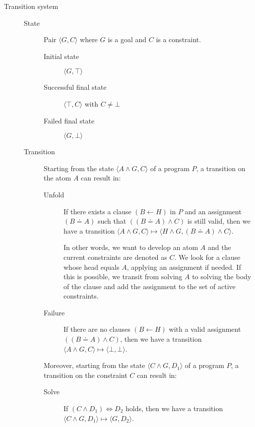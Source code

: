 \begin{description}
    \item[Transition system] 
        \phantom{}
        \begin{description}
            \item[State] Pair $\langle G, C \rangle$ where $G$ is a goal and $C$ is a constraint.
                \begin{description}
                    \item[Initial state] $\langle G, \top \rangle$ 
                    \item[Successful final state] $\langle \top, C \rangle$ with $C \neq \bot$
                    \item[Failed final state] $\langle G, \bot \rangle$
                \end{description}

            \item[Transition]
                Starting from the state $\langle A \land G, C \rangle$ of a program $P$, a transition on the atom $A$ can result in:
                \begin{description}
                    \item[Unfold] 
                        If there exists a clause $(B \leftarrow H)$ in $P$ and 
                        an assignment $(B \doteq A)$ such that $((B \doteq A) \land C)$ is still valid,
                        then we have a transition $\langle A \land G, C \rangle \mapsto \langle H \land G, (B \doteq A) \land C \rangle$.

                        In other words, we want to develop an atom $A$ and the current constraints are denoted as $C$.
                        We look for a clause whose head equals $A$, applying an assignment if needed.
                        If this is possible, we transit from solving $A$ to solving the body of the clause and 
                        add the assignment to the set of active constraints.

                    \item[Failure] 
                        If there are no clauses $(B \leftarrow H)$ with a valid assignment $((B \doteq A) \land C)$,
                        then we have a transition $\langle A \land G, C \rangle \mapsto \langle \bot, \bot \rangle$.
                \end{description}

                Moreover, starting from the state $\langle C \land G, D_1 \rangle$ of a program $P$, a transition on the constraint $C$ can result in:
                \begin{description}
                    \item[Solve] 
                        If $(C \land D_1) \iff D_2$ holds,
                        then we have a transition $\langle C \land G, D_1 \rangle \mapsto \langle G, D_2 \rangle$.


\end{description}
\end{description}
\end{description}
